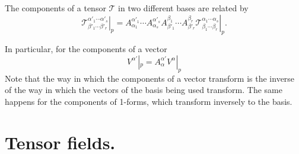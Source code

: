 \begin{points}
\item The components of a tensor $\mathcal T$ in two different bases are related by
\[
  \left.\mathcal T^{\alpha'_1\cdots\alpha'_s}_{\beta'_1\cdots\beta'_r}\right|_p=A^{\alpha'_1}_{\alpha_1}\cdots A^{\alpha'_s}_{\alpha_s}A^{\beta_1}_{\beta'_1}\cdots A^{\beta_r}_{\beta'_r}\left.\mathcal T^{\alpha_1\cdots\alpha_s}_{\beta_1\cdots\beta_r}\right|_p .
\]

\item In particular, for the components of a vector
\[
  V^{\alpha'}|_p=A^{\alpha'}_\alpha V^\alpha|_p
\]
Note that the way in which the components of a vector transform is the inverse of the way in which the vectors of the basis being used transform. The same happens for the components of 1-forms, which transform inversely to the basis.
\end{points}

\section{Tensor fields.}

